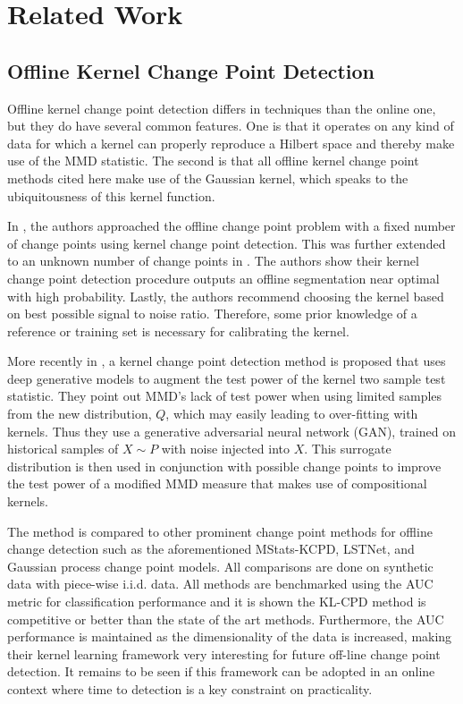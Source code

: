 \section{Related Work}
\label{related_works}

\subsection{Offline Kernel Change Point Detection}
Offline kernel change point detection differs in techniques than the online one, but they do have several common features. One is that it operates on any kind of data for which a kernel can properly reproduce a Hilbert space and thereby make use of the MMD statistic. The second is that all offline kernel change point methods cited here make use of the Gaussian kernel, which speaks to the ubiquitousness of this kernel function. 

In \cite{harchaoui2007retrospective}, the authors approached the offline change point problem with a fixed number of change points using kernel change point detection. This was further extended to an unknown number of change points in \cite{arlot2012kernel}. The authors show their kernel change point detection procedure outputs an offline segmentation near optimal with high probability. Lastly, the authors recommend choosing the kernel based on best possible signal to noise ratio. Therefore, some prior knowledge of a reference or training set is necessary for calibrating the kernel. 

More recently in \cite{chang2019kernel}, a  kernel change point detection method is proposed that uses deep generative models to augment the test power of the kernel two sample test statistic. They point out MMD's lack of test power when using limited samples from the new distribution, $Q$, which may easily leading to over-fitting with kernels. Thus they use a generative adversarial neural network (GAN), trained on historical samples of $X \sim  P$  with noise injected into $X$. This surrogate distribution is then used in conjunction with possible change points to improve the test power of a modified MMD measure that makes use of compositional kernels.

The method is compared to other prominent change point methods for offline change detection such as the aforementioned MStats-KCPD, LSTNet, and Gaussian process change point models. All comparisons are done on synthetic data with piece-wise i.i.d. data. All methods are benchmarked using the AUC metric for classification performance and it is shown the KL-CPD method is competitive or better than the state of the art methods.  Furthermore, the AUC performance is maintained as the dimensionality of the data is increased, making their kernel learning framework very interesting for future off-line change point detection. It remains to be seen if this framework can be adopted in an online context where time to detection is a key constraint on practicality.

